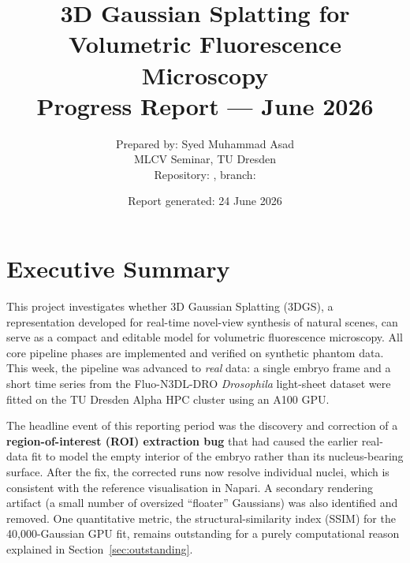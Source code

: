 \documentclass[11pt,a4paper]{article}
\title{\textbf{3D Gaussian Splatting for Volumetric Fluorescence Microscopy}\\
\large Progress Report --- June 2026}
\author{
Prepared by: Syed Muhammad Asad\\
MLCV Seminar, TU Dresden\\
Repository: \code{asadrizvi64/DeepLearning-Seminar-TeamProject}, branch: \code{main}
}
\date{Report generated: 24 June 2026}
\begin{document}
\maketitle

\section*{Executive Summary}

This project investigates whether 3D Gaussian Splatting (3DGS), a representation
developed for real-time novel-view synthesis of natural scenes, can serve as a
compact and editable model for volumetric fluorescence microscopy. All core
pipeline phases are implemented and verified on synthetic phantom data. This week,
the pipeline was advanced to \emph{real} data: a single embryo frame and a short
time series from the Fluo-N3DL-DRO \emph{Drosophila} light-sheet dataset were fitted
on the TU Dresden Alpha HPC cluster using an A100 GPU.

The headline event of this reporting period was the discovery and correction of a
\textbf{region-of-interest (ROI) extraction bug} that had caused the earlier real-data
fit to model the empty interior of the embryo rather than its nucleus-bearing surface.
After the fix, the corrected runs now resolve individual nuclei, which is consistent
with the reference visualisation in Napari. A secondary rendering artifact (a small
number of oversized ``floater'' Gaussians) was also identified and removed. One
quantitative metric, the structural-similarity index (SSIM) for the 40{,}000-Gaussian
GPU fit, remains outstanding for a purely computational reason explained in
Section~\ref{sec:outstanding}.
\end{document}
